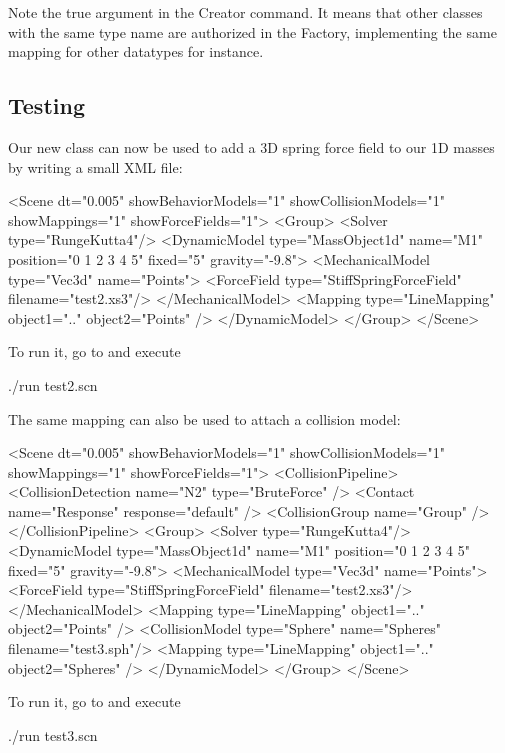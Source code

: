 Note the true argument in the Creator command. It means that other classes with the same type name are authorized in the Factory, implementing the same mapping for other datatypes for instance.

\subsection{Testing}

Our new class can now be used to add a 3D spring force field to our 1D masses by writing a small XML file:

\begin{code_xml}
<Scene dt="0.005" showBehaviorModels="1" showCollisionModels="1" showMappings="1" showForceFields="1">
	<Group>
		<Solver type="RungeKutta4"/>
		<DynamicModel type="MassObject1d" name="M1" position="0 1 2 3 4 5" fixed="5" gravity="-9.8">
		<MechanicalModel type="Vec3d" name="Points">
		<ForceField type="StiffSpringForceField" filename="test2.xs3"/>
		</MechanicalModel>
		<Mapping type="LineMapping" object1=".." object2="Points" />
		</DynamicModel>
	</Group>
</Scene>
\end{code_xml}

To run it, go to  and execute
\begin{code_bash}
./run test2.scn
\end{code_bash}

The same mapping can also be used to attach a collision model:

\begin{code_xml}
<Scene dt="0.005" showBehaviorModels="1" showCollisionModels="1" showMappings="1" showForceFields="1">
	<CollisionPipeline>
		<CollisionDetection name="N2" type="BruteForce" />
		<Contact name="Response" response="default" />
		<CollisionGroup name="Group" />
	</CollisionPipeline>
	<Group>
		<Solver type="RungeKutta4"/>
		<DynamicModel type="MassObject1d" name="M1" position="0 1 2 3 4 5" fixed="5" gravity="-9.8">
		<MechanicalModel type="Vec3d" name="Points">
		<ForceField type="StiffSpringForceField" filename="test2.xs3"/>
		</MechanicalModel>
		<Mapping type="LineMapping" object1=".." object2="Points" />
		<CollisionModel type="Sphere" name="Spheres" filename="test3.sph"/>
		<Mapping type="LineMapping" object1=".." object2="Spheres" />
		</DynamicModel>
	</Group>
</Scene>
\end{code_xml}

To run it, go to  and execute
\begin{code_bash}
./run test3.scn
\end{code_bash}


